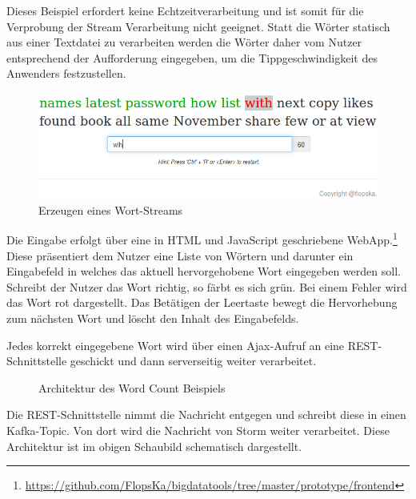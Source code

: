 \documentclass[a4paper,11pt]{scrartcl}
\begin{document}
  Dieses Beispiel erfordert keine Echtzeitverarbeitung und ist somit
  für die Verprobung der Stream Verarbeitung nicht geeignet. Statt die
  Wörter statisch aus einer Textdatei zu verarbeiten werden die Wörter
  daher vom Nutzer entsprechend der Aufforderung eingegeben, um die
  Tippgeschwindigkeit des Anwenders festzustellen.

  \begin{figure}[!h]
    \centering
    \includegraphics[scale=0.4,natwidth=750,natheight=234]{../presentation/img/webapp.png}
    \caption{Erzeugen eines Wort-Streams\protect\footnotemark}
  \end{figure}


  Die Eingabe erfolgt über eine in HTML und JavaScript geschriebene
  WebApp.\footnote{\url{https://github.com/FlopsKa/bigdatatools/tree/master/prototype/frontend}}
  Diese präsentiert dem Nutzer eine Liste von Wörtern und darunter ein
  Eingabefeld in welches das aktuell hervorgehobene Wort eingegeben werden
  soll. Schreibt der Nutzer das Wort richtig, so färbt es sich grün. Bei einem
  Fehler wird das Wort rot dargestellt.  Das Betätigen der Leertaste bewegt die
  Hervorhebung zum nächsten Wort und löscht den Inhalt des Eingabefelds.

  Jedes korrekt eingegebene Wort wird über einen Ajax-Aufruf an eine
  REST-Schnittstelle geschickt und dann serverseitig weiter
  verarbeitet.

  \begin{figure}[!h]
    \center
    \scalebox{.7}{}
    \caption{Architektur des Word Count Beispiels}
    \label{fig:wordcountsamplearchitecture}
  \end{figure}

  Die REST-Schnittstelle nimmt die Nachricht entgegen und schreibt
  diese in einen Kafka-Topic. Von dort wird die Nachricht von Storm
  weiter verarbeitet. Diese Architektur ist im obigen Schaubild
  schematisch dargestellt.
\end{document}
